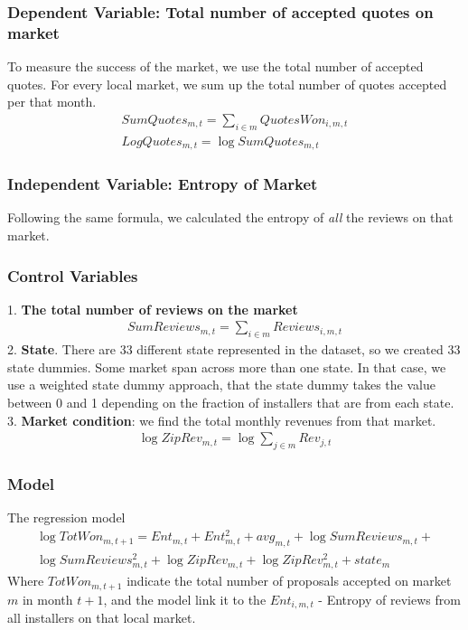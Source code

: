 \documentclass[mnsc,blindrev]{informs3} %
\begin{document}
\subsubsection{Dependent Variable: Total number of accepted quotes on market}
To measure the success of the market, we use the total number of accepted quotes. For every local market, we sum up the total number of quotes accepted per that month. 
\begin{align*}
SumQuotes_{m,t}=\sum_{i\in m} QuotesWon_{i,m,t}\\
LogQuotes_{m,t}=\log SumQuotes_{m,t}
\end{align*}

\subsubsection{Independent Variable: Entropy of Market}
Following the same formula, we calculated the entropy of \textit{all} the reviews on that market. 
\subsubsection{Control Variables}
1. \textbf{The total number of reviews on the market }
\begin{align*}
SumReviews_{m,t}=\sum_{i\in m} Reviews_{i,m,t}
\end{align*}
2. \textbf{State}. There are 33 different state represented in the dataset, so we created 33 state dummies. Some market span across more than one state. In that case, we use a weighted state dummy approach, that the state dummy takes the value between 0 and 1 depending on the fraction of installers that are from each state. \\
3. \textbf{Market condition}: 
we find the total monthly revenues from that market. 
\begin{align*}
\log ZipRev_{m,t}=\log \sum_{j\in m}Rev_{j,t}
\end{align*}

\subsubsection{Model}
The regression model 
\begin{equation}
\begin{aligned}
\log{TotWon_{m,t+1}}=Ent_{m,t}+Ent_{m,t}^2+avg_{m,t}+\log SumReviews_{m,t}+\\
\log SumReviews_{m,t}^2+\log ZipRev_{m,t}+\log ZipRev_{m,t}^2+state_{m}
\end{aligned}
\end{equation}
Where $TotWon_{m,t+1}$ indicate the total number of proposals accepted on market $m$ in month $t+1$, and the model link it to the $Ent_{i,m,t}$ - Entropy of reviews from all installers on that local market. 
\end{document}
